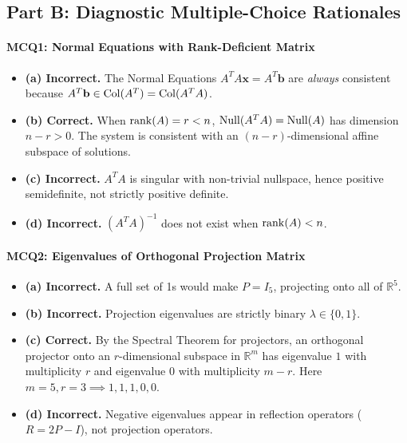 \subsection*{Part B: Diagnostic Multiple-Choice Rationales}

\paragraph{MCQ1: Normal Equations with Rank-Deficient Matrix}
\begin{itemize}
    \item \textbf{(a) Incorrect.} The Normal Equations $A^T A \mathbf{x} = A^T \mathbf{b}$ are \emph{always} consistent because $A^T \mathbf{b} \in \operatorname{Col}(A^T) = \operatorname{Col}(A^T A)$.
    \item \textbf{(b) Correct.} When $\operatorname{rank}(A) = r < n$, $\operatorname{Null}(A^T A) = \operatorname{Null}(A)$ has dimension $n - r > 0$. The system is consistent with an $(n-r)$-dimensional affine subspace of solutions.
    \item \textbf{(c) Incorrect.} $A^T A$ is singular with non-trivial nullspace, hence positive semidefinite, not strictly positive definite.
    \item \textbf{(d) Incorrect.} $(A^T A)^{-1}$ does not exist when $\operatorname{rank}(A) < n$.
\end{itemize}

\paragraph{MCQ2: Eigenvalues of Orthogonal Projection Matrix}
\begin{itemize}
    \item \textbf{(a) Incorrect.} A full set of 1s would make $P = I_5$, projecting onto all of $\mathbb{R}^5$.
    \item \textbf{(b) Incorrect.} Projection eigenvalues are strictly binary $\lambda \in \{0, 1\}$.
    \item \textbf{(c) Correct.} By the Spectral Theorem for projectors, an orthogonal projector onto an $r$-dimensional subspace in $\mathbb{R}^m$ has eigenvalue $1$ with multiplicity $r$ and eigenvalue $0$ with multiplicity $m - r$. Here $m=5, r=3 \implies 1, 1, 1, 0, 0$.
    \item \textbf{(d) Incorrect.} Negative eigenvalues appear in reflection operators ($R = 2P - I$), not projection operators.
\end{itemize}

